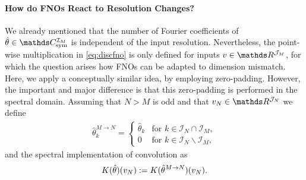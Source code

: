 \paragraph{How do FNOs React to Resolution Changes?}
%
We already mentioned that the number of Fourier coefficients of $\hat\param\in\Csym^{\mathcal{I}_M}$ is independent of the input resolution. Nevertheless, the point-wise multiplication in \cref{eq:discfno} is only defined for inputs $\imgg\in\R^{\mathcal{J}_M}$, for which the question arises how FNOs can be adapted to dimension mismatch. Here, we apply a conceptually similar idea, by employing zero-padding. However, the important and major difference is that this zero-padding is performed in the spectral domain. Assuming that $N>M$ is odd and that $\imgg_N\in\R^{\mathcal{J}_N}$ we define
%
%
\begin{align*}
\hat{\theta}^{M \rightarrow N}_k = \begin{cases}
\hat{\theta}_k & \text{for } k \in \mathcal{I}_N \cap \mathcal{I}_M,\\
0 & \text{for } k \in \mathcal{I}_N \backslash \mathcal{I}_M,
\end{cases}
\end{align*}
%
%
and the spectral implementation of convolution as
%
%
\begin{equation*}
   K(\hat{\theta})(v_N) := K(\hat{\theta}^{M \rightarrow N})(v_N).
\end{equation*}
%
%
